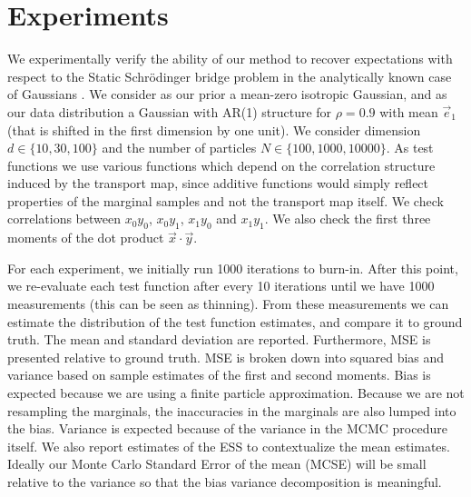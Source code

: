 \documentclass{article}
\begin{document}
\section{Experiments}
We experimentally verify the ability of our method to recover expectations with
respect to the Static Schrödinger bridge problem in the analytically known case
of Gaussians \cite{pmlr-v206-bunne23a}. We consider as our prior a mean-zero
isotropic Gaussian, and as our data distribution a Gaussian with AR(1) structure
for $\rho=0.9$ with mean $\vec e_1$ (that is shifted in the first dimension by
one unit).  We consider dimension $d \in \{10, 30, 100\}$ and the number of
particles $N \in \{100, 1000, 10000\}$. As test functions we use various
functions which depend on the correlation structure induced by the transport
map, since additive functions would simply reflect properties of the marginal
samples and not the transport map itself. We check correlations between
$x_0y_0$, $x_0y_1$, $x_1y_0$ and $x_1y_1$. We also check the first three moments
of the dot product $\vec x \cdot \vec y$. 


For each experiment,
we initially run 1000 iterations to burn-in. After this point, we re-evaluate
each test function after every 10 iterations until we have 1000 measurements
(this can be seen as thinning). From these measurements we can estimate the
distribution of the test function estimates, and compare it to ground truth.
The mean and standard deviation are reported. Furthermore, MSE is presented
relative to ground truth. MSE is broken down into squared bias and variance
based on sample estimates of the first and second moments. Bias is expected
because we are using a finite particle approximation. Because we are not
resampling the marginals, the inaccuracies in the marginals are also lumped into
the bias. Variance is expected because of the variance in the MCMC procedure
itself. We also report estimates of the ESS to contextualize the mean estimates.
Ideally our Monte Carlo Standard Error of the mean (MCSE) will be small relative
to the variance so that the bias variance decomposition is meaningful. 
\end{document}
